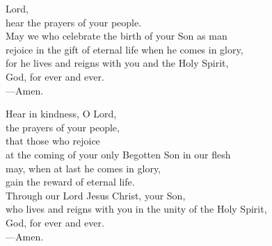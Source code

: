 \prayer


\begin{prayerverse}
Lord,\\
hear the prayers of your people.\\
May we who celebrate the birth of your Son as man\\
rejoice in the gift of eternal life when he comes in glory,\\
for he lives and reigns with you and the Holy Spirit,\\
God, for ever and ever.\\
{\color{red}---\thinspace}Amen.
\end{prayerverse}


\begin{prayerverse}
Hear in kindness, O Lord,\\
the prayers of your people,\\
that those who rejoice\\
at the coming of your only Begotten Son in our flesh\\
may, when at last he comes in glory,\\
gain the reward of eternal life.\\
Through our Lord Jesus Christ, your Son,\\
who lives and reigns with you in the unity of the Holy Spirit,\\
God, for ever and ever.\\
{\color{red}---\thinspace}Amen.

\end{prayerverse}

